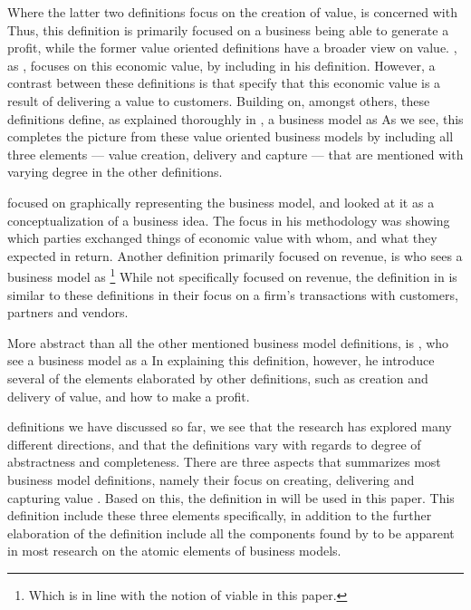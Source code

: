 Where the latter two definitions focus on the creation of value, \citet{chesbrough2002} is concerned with  Thus, this definition is primarily focused on a business being able to generate a profit, while the former value oriented definitions have a broader view on value. \citet[]{teece2010}, as \citet{chesbrough2002}, focuses on this economic value, by including  in his definition. However, a contrast between these definitions is that \citet{teece2010} specify that this economic value is a result of delivering a value to customers. Building on, amongst others, these definitions \citet{osterwalder2010} define, as explained thoroughly in \citet{osterwalder2005}, a business model as  As we see, this completes the picture from these value oriented business models by including all three elements --- value creation, delivery and capture --- that are mentioned with varying degree in the other definitions.

\citet{gordijn2002} focused on graphically representing the business model, and looked at it as a conceptualization of a business idea. The focus in his methodology was showing which parties exchanged things of economic value with whom, and what they expected in return. Another definition primarily focused on revenue, is \citet{rappa2010} who sees a business model as \footnote{Which is in line with the notion of viable in this paper.} While not specifically focused on revenue, the definition in \citet{zott2008} is similar to these definitions in their focus on a firm's transactions with customers, partners and vendors.

More abstract than all the other mentioned business model definitions, is \citet[]{magretta2002}, who see a business model as a  In explaining this definition, however, he introduce several of the elements elaborated by other definitions, such as creation and delivery of value, and how to make a profit.

 definitions we have discussed so far, we see that the research has explored many different directions, and that the definitions vary with regards to degree of abstractness and completeness. There are three aspects that summarizes most business model definitions, namely their focus on creating, delivering and capturing value \citep{osterwalder2005,itami2010,sosna2010,teece2010,zott2010b}. Based on this, the definition in \citet{osterwalder2010} will be used in this paper. This definition include these three elements specifically, in addition to the further elaboration of the definition include all the components found by \citet{pateli2004} to be apparent in most research on the atomic elements of business models. 

